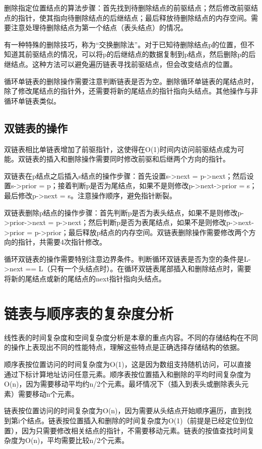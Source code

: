 \documentclass[12pt, a4paper]{article}
\begin{document}
删除指定位置结点的算法步骤：首先找到待删除结点的前驱结点；然后修改前驱结点的指针，使其指向待删除结点的后继结点；最后释放待删除结点的内存空间。需要注意处理待删除结点为第一个结点（表头结点）的情况。

有一种特殊的删除技巧，称为“交换删除法”。对于已知待删除结点p的位置，但不知道其前驱结点的情况，可以将p的后继结点的数据复制到p结点，然后删除p的后继结点。这种方法可以避免遍历链表寻找前驱结点，但会改变结点的位置。

循环单链表的删除操作需要注意判断链表是否为空。删除循环单链表的尾结点时，除了修改尾结点的指针外，还需要将新的尾结点的指针指向头结点。其他操作与非循环单链表类似。

\subsection{双链表的操作}

双链表相比单链表增加了前驱指针，这使得在O(1)时间内访问前驱结点成为可能。双链表的插入和删除操作需要同时修改前驱和后继两个方向的指针。

双链表在p结点之后插入s结点的操作步骤：首先设置s->next = p->next；然后设置s->prior = p；接着判断p是否为尾结点，如果不是则修改p->next->prior = s；最后修改p->next = s。注意操作顺序，避免指针断裂。

双链表删除p结点的操作步骤：首先判断p是否为表头结点，如果不是则修改p->prior->next = p->next；然后判断p是否为表尾结点，如果不是则修改p->next->prior = p->prior；最后释放p结点的内存空间。双链表删除操作需要修改两个方向的指针，共需要4次指针修改。

循环双链表的操作需要特别注意边界条件。判断循环双链表是否为空的条件是L->next == L（只有一个头结点时）。在循环双链表尾部插入和删除结点时，需要将新的尾结点或新的尾结点的next指针指向头结点。

\section{链表与顺序表的复杂度分析}

线性表的时间复杂度和空间复杂度分析是本章的重点内容。不同的存储结构在不同的操作上表现出不同的性能特点，理解这些特点是正确选择存储结构的依据。

顺序表按位置访问的时间复杂度为O(1)，这是因为数组支持随机访问，可以直接通过下标计算地址访问任意元素。顺序表按位置插入和删除的平均时间复杂度为O(n)，因为需要移动平均约n/2个元素。最坏情况下（插入到表头或删除表头元素）需要移动n个元素。

链表按位置访问的时间复杂度为O(n)，因为需要从头结点开始顺序遍历，直到找到第i个结点。链表按位置插入和删除的时间复杂度为O(1)（前提是已经定位到位置），因为只需要修改相关结点的指针，不需要移动元素。链表的按值查找时间复杂度为O(n)，平均需要比较n/2个元素。
\end{document}
